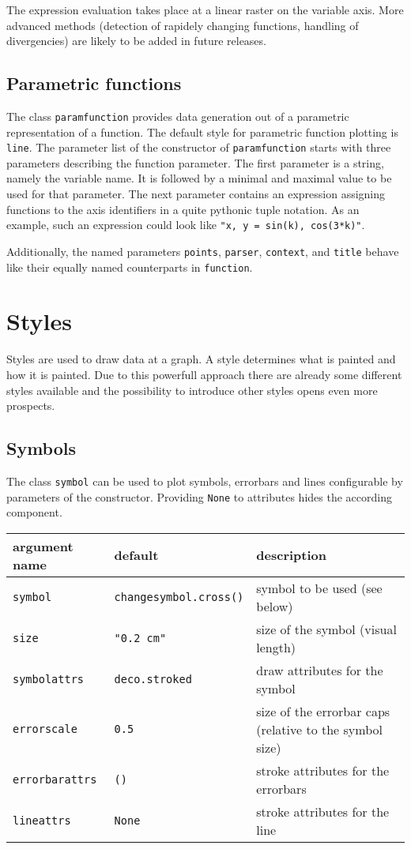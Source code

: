 The expression evaluation takes place at a linear raster on the
variable axis. More advanced methods (detection of rapidely changing
functions, handling of divergencies) are likely to be added in future
releases.

\subsection{Parametric functions}

The class \verb|paramfunction| provides data generation out of a
parametric representation of a function. The default style for
parametric function plotting is \verb|line|. The parameter list of the
constructor of \verb|paramfunction| starts with three parameters
describing the function parameter. The first parameter is a string,
namely the variable name. It is followed by a minimal and maximal
value to be used for that parameter. The next parameter contains an
expression assigning functions to the axis identifiers in a quite
pythonic tuple notation. As an example, such an expression could look
like \verb|"x, y = sin(k), cos(3*k)"|.

Additionally, the named parameters \verb|points|, \verb|parser|,
\verb|context|, and \verb|title| behave like their equally named
counterparts in \verb|function|.

\section{Styles}
\label{graph:styles}

Styles are used to draw data at a graph. A style determines what is
painted and how it is painted. Due to this powerfull approach there
are already some different styles available and the possibility to
introduce other styles opens even more prospects.

\subsection{Symbols}

The class \verb|symbol| can be used to plot symbols, errorbars and lines
configurable by parameters of the constructor. Providing \verb|None|
to attributes hides the according component.

\medskip
\begin{tabularx}{\linewidth}{ll>{\raggedright\arraybackslash}X}
argument name&default&description\\
\hline
\texttt{symbol}&\texttt{changesymbol.cross()}&symbol to be used (see below)\\
\texttt{size}&\texttt{"0.2 cm"}&size of the symbol (visual length)\\
\texttt{symbolattrs}&\texttt{deco.stroked}&draw attributes for the symbol\\
\texttt{errorscale}&\texttt{0.5}&size of the errorbar caps (relative to the symbol size)\\
\texttt{errorbarattrs}&\texttt{()}&stroke attributes for the errorbars\\
\texttt{lineattrs}&\texttt{None}&stroke attributes for the line\\
\end{tabularx}
\medskip

